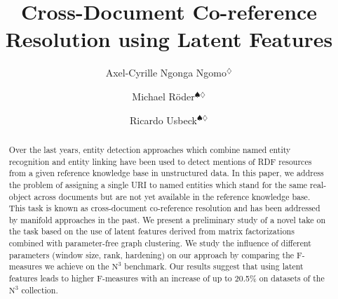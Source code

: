 \documentclass{llncs}
\begin{document}
\title{Cross-Document Co-reference Resolution using Latent Features}


\author{
Axel-Cyrille Ngonga Ngomo$^{\diamondsuit}$ \and
Michael R\"oder$^{\spadesuit\diamondsuit}$ \and 
Ricardo Usbeck$^{\spadesuit\diamondsuit}$ 
}

\maketitle

\newcommand{\goodgap}{%
\hspace{\subfigtopskip}%
\hspace{\subfigbottomskip}}

\begin{abstract}
Over the last years, entity detection approaches which combine named entity recognition and entity linking have been used to detect mentions of RDF resources from a given reference knowledge base in unstructured data. In this paper, we address the problem of assigning a single URI to named entities which stand for the same real-object across documents but are not yet available in the reference knowledge base. This task is known as cross-document co-reference resolution and has been addressed by manifold approaches in the past. We present a preliminary study of a novel take on the task based on the use of latent features derived from matrix factorizations combined with parameter-free graph clustering. 
We study the influence of different parameters (window size, rank, hardening) on our approach by comparing the F-measures we achieve on the $\mbox{N}^3$ benchmark.
Our results suggest that using latent features leads to higher F-measures with an increase of up to 20.5\% on datasets of the $\mbox{N}^3$ collection.
\end{abstract} 

\end{document}
